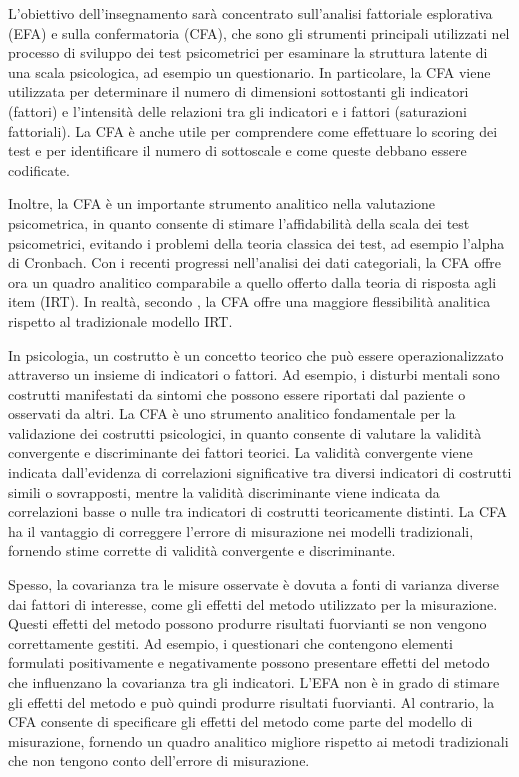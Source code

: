 \documentclass[
]{book}
\begin{document}
L'obiettivo dell'insegnamento sarà concentrato sull'analisi fattoriale esplorativa (EFA) e sulla confermatoria (CFA), che sono gli strumenti principali utilizzati nel processo di sviluppo dei test psicometrici per esaminare la struttura latente di una scala psicologica, ad esempio un questionario. In particolare, la CFA viene utilizzata per determinare il numero di dimensioni sottostanti gli indicatori (fattori) e l'intensità delle relazioni tra gli indicatori e i fattori (saturazioni fattoriali). La CFA è anche utile per comprendere come effettuare lo scoring dei test e per identificare il numero di sottoscale e come queste debbano essere codificate.

Inoltre, la CFA è un importante strumento analitico nella valutazione psicometrica, in quanto consente di stimare l'affidabilità della scala dei test psicometrici, evitando i problemi della teoria classica dei test, ad esempio l'alpha di Cronbach. Con i recenti progressi nell'analisi dei dati categoriali, la CFA offre ora un quadro analitico comparabile a quello offerto dalla teoria di risposta agli item (IRT). In realtà, secondo \citet{brown2015confirmatory}, la CFA offre una maggiore flessibilità analitica rispetto al tradizionale modello IRT.

In psicologia, un costrutto è un concetto teorico che può essere operazionalizzato attraverso un insieme di indicatori o fattori. Ad esempio, i disturbi mentali sono costrutti manifestati da sintomi che possono essere riportati dal paziente o osservati da altri. La CFA è uno strumento analitico fondamentale per la validazione dei costrutti psicologici, in quanto consente di valutare la validità convergente e discriminante dei fattori teorici. La validità convergente viene indicata dall'evidenza di correlazioni significative tra diversi indicatori di costrutti simili o sovrapposti, mentre la validità discriminante viene indicata da correlazioni basse o nulle tra indicatori di costrutti teoricamente distinti. La CFA ha il vantaggio di correggere l'errore di misurazione nei modelli tradizionali, fornendo stime corrette di validità convergente e discriminante.

Spesso, la covarianza tra le misure osservate è dovuta a fonti di varianza diverse dai fattori di interesse, come gli effetti del metodo utilizzato per la misurazione. Questi effetti del metodo possono produrre risultati fuorvianti se non vengono correttamente gestiti. Ad esempio, i questionari che contengono elementi formulati positivamente e negativamente possono presentare effetti del metodo che influenzano la covarianza tra gli indicatori. L'EFA non è in grado di stimare gli effetti del metodo e può quindi produrre risultati fuorvianti. Al contrario, la CFA consente di specificare gli effetti del metodo come parte del modello di misurazione, fornendo un quadro analitico migliore rispetto ai metodi tradizionali che non tengono conto dell'errore di misurazione.
\end{document}
